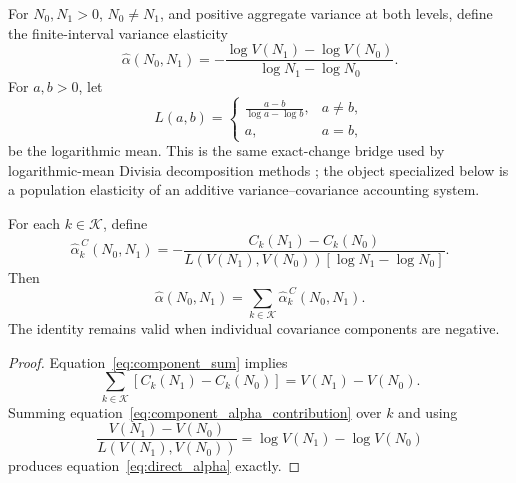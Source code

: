 {For $N_0,N_1>0$, $N_0\neq N_1$, and positive aggregate variance at both
levels, define the finite-interval variance elasticity
\begin{equation}
\label{eq:direct_alpha}
    \widehat{\alpha}(N_0,N_1)
    =
    -\frac{
        \log V(N_1)-\log V(N_0)
    }{
        \log N_1-\log N_0
    }.
\end{equation}
For $a,b>0$, let
\begin{equation}
\label{eq:log_mean}
    L(a,b)
    =
    \begin{cases}
        \displaystyle\frac{a-b}{\log a-\log b}, & a\neq b,\\[1em]
        a, & a=b,
    \end{cases}
\end{equation}
be the logarithmic mean. This is the same exact-change bridge used by
logarithmic-mean Divisia decomposition methods \citep{ang2005}; the
object specialized below is a population elasticity of an additive
variance--covariance accounting system.

\begin{proposition}
\label{prop:exact_decomposition}
For each $k\in\mathcal{K}$, define
\begin{equation}
\label{eq:component_alpha_contribution}
    \widehat{\alpha}^{\,C}_k(N_0,N_1)
    =
    -\frac{
        C_k(N_1)-C_k(N_0)
    }{
        L\!\left(V(N_1),V(N_0)\right)
        \left[\log N_1-\log N_0\right]
    }.
\end{equation}
Then
\begin{equation}
\label{eq:exact_alpha_decomposition}
    \widehat{\alpha}(N_0,N_1)
    =
    \sum_{k\in\mathcal{K}}
    \widehat{\alpha}^{\,C}_k(N_0,N_1).
\end{equation}
The identity remains valid when individual covariance components are
negative.
\end{proposition}

\begin{proof}
Equation~\eqref{eq:component_sum} implies
\begin{equation}
    \sum_{k\in\mathcal{K}}
    \left[C_k(N_1)-C_k(N_0)\right]
    =V(N_1)-V(N_0).
\end{equation}
Summing equation~\eqref{eq:component_alpha_contribution} over $k$ and
using
\begin{equation}
    \frac{V(N_1)-V(N_0)}{L(V(N_1),V(N_0))}
    =\log V(N_1)-\log V(N_0)
\end{equation}
produces equation~\eqref{eq:direct_alpha} exactly.
\end{proof}

}
